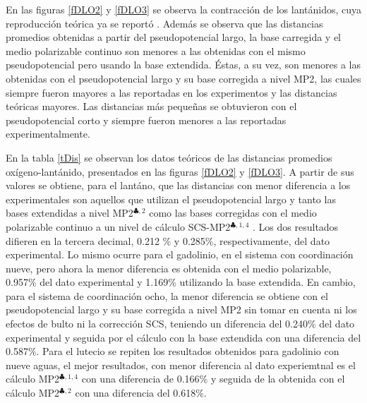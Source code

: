 En las figuras \ref{fDLO2} y \ref{fDLO3} se observa la contracci\'on 
de los lant\'anidos, cuya reproducci\'on te\'orica ya se report\'o
\citep{Kuta2010,Ciup2010,Dang2012}. Adem\'as se observa que las 
distancias promedios obtenidas a partir del pseudopotencial largo, la
base carregida y el medio polarizable continuo son menores a las 
obtenidas con el mismo pseudopotencial pero usando la base extendida.
\'Estas, a su vez, son menores a las obtenidas con el pseudopotencial
largo y su base corregida a nivel MP2, las cuales siempre fueron 
mayores a las reportadas en los experimentos y las distancias 
te\'oricas mayores. Las distancias m\'as peque\~nas se obtuvieron con
el pseudopotencial corto y siempre fueron menores a las reportadas 
experimentalmente.
  



En la tabla \ref{tDis} se observan los datos te\'oricos de las 
distancias promedios ox\'igeno-lant\'anido, presentados en las
figuras \ref{fDLO2} y \ref{fDLO3}. A partir de sus valores se 
obtiene, para el lant\'ano, que las distancias con menor diferencia a
los experimentales son aquellos que utilizan el pseudopotencial largo 
\citep{Dolg1989} y tanto las bases extendidas \citep{Yang2005} a 
nivel MP2$^{\clubsuit,2}$ como las bases corregidas \citep{Dolg1993} 
con el medio polarizable continuo a un nivel de c\'alculo 
SCS-MP2$^{\clubsuit,1,4}$ . Los dos resultados difieren en la tercera
decimal, 0.212 \% y 0.285\%, respectivamente, del dato experimental.
Lo mismo ocurre para el gadolinio, en el sistema con coordinaci\'on
nueve, pero ahora la menor diferencia es obtenida con el medio 
polarizable, 0.957\% del dato experimental y 1.169\% utilizando la
base extendida. En cambio, para el sistema de coordinaci\'on ocho, la
menor diferencia se obtiene con el pseudopotencial largo y su base 
corregida a nivel MP2 sin tomar en cuenta ni los efectos de bulto ni
la correcci\'on SCS, teniendo un diferencia del 0.240\% del dato
experimental y seguida por el c\'alculo con la base extendida con una
diferencia del 0.587\%. Para el lutecio se repiten los resultados
obtenidos para gadolinio con nueve aguas, el mejor resultados, con 
menor diferencia al dato experiemtnal es el c\'alculo 
MP2$^{\clubsuit,1,4}$ con una diferencia de 0.166\% y seguida de la
obtenida con el c\'alculo MP2$^{\clubsuit,2}$ con una diferencia del
0.618\%.

